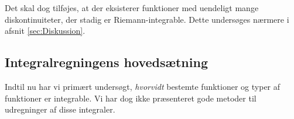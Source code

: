 Det skal dog tilføjes, at der eksisterer funktioner med uendeligt mange diskontinuiteter, der stadig er Riemann-integrable.
Dette undersøges nærmere i afsnit \ref{sec:Diskussion}.

\subsection{Integralregningens hovedsætning}%
\label{sub:Integralregningens hovedsætning}
Indtil nu har vi primært undersøgt, \textit{hvorvidt} bestemte funktioner og typer af funktioner er integrable.
Vi har dog ikke præsenteret gode metoder til udregninger af disse integraler.



